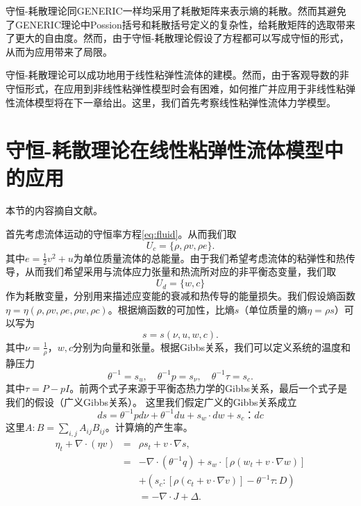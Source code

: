 \documentclass{article}
\begin{document}
	守恒-耗散理论同GENERIC一样均采用了耗散矩阵来表示熵的耗散。然而其避免了GENERIC理论中Possion括号和耗散括号定义的复杂性，给耗散矩阵的选取带来了更大的自由度。然而，由于守恒-耗散理论假设了方程都可以写成守恒的形式，从而为应用带来了局限。

	守恒-耗散理论可以成功地用于线性粘弹性流体的建模。然而，由于客观导数的非守恒形式，在应用到非线性粘弹性模型时会有困难，如何推广并应用于非线性粘弹性流体模型将在下一章给出。这里，我们首先考察线性粘弹性流体力学模型。

	\section{守恒-耗散理论在线性粘弹性流体模型中的应用}
	本节的内容摘自文献\cite{}。

	首先考虑流体运动的守恒率方程\eqref{eq:fluid}。从而我们取
	\begin{equation*}
		U_c = \{\rho, \rho v, \rho e\}.
	\end{equation*}
	其中$e = \frac{1}{2} v^2 + u$为单位质量流体的总能量。由于我们希望考虑流体的粘弹性和热传导，从而我们希望采用与流体应力张量和热流所对应的非平衡态变量，我们取
	\begin{equation*}
		U_d = \{ w, c\}
	\end{equation*}
	作为耗散变量，分别用来描述应变能的衰减和热传导的能量损失。我们假设熵函数$\eta = \eta (\rho,\rho v ,\rho e, \rho w, \rho c)$。根据熵函数的可加性，比熵$s$（单位质量的熵$\eta = \rho s$）可以写为
	\begin{equation}
		s = s(\nu, u, w, c).
	\end{equation}
	其中$\nu = \frac{1}{\rho}$，$w,c$分别为向量和张量。根据Gibbs关系，我们可以定义系统的温度和静压力
	\begin{equation}
		\theta^{-1} = s_u, \quad \theta^{-1} p = s_{\nu}, \quad \theta^{-1} \tau = s_c.
	\end{equation}
	其中$\tau = P - pI$。前两个式子来源于平衡态热力学的Gibbs关系，最后一个式子是我们的假设（广义Gibbs关系）。
	这里我们假定广义的Gibbs关系成立
	\begin{equation*}
		ds = \theta^{-1} pd\nu + \theta^{-1} du + s_w \cdot dw + s_c ：dc
	\end{equation*}
	这里$A:B = \sum_{i,j}A_{ij}B_{ij}$。计算熵的产生率。
	\begin{eqnarray*}
		\eta_t + \nabla \cdot (\eta v) &=& \rho s_t + v \cdot \nabla s, \\
		&=& -\nabla \cdot (\theta^{-1} q) + s_w \cdot [\rho (w_t + v \cdot \nabla w)] \\
		&&+ (s_c:[\rho (c_t + v \cdot \nabla v)] - \theta^{-1} \tau : D) \\
		&& = -\nabla \cdot J + \Delta.
	\end{eqnarray*}
\end{document}
